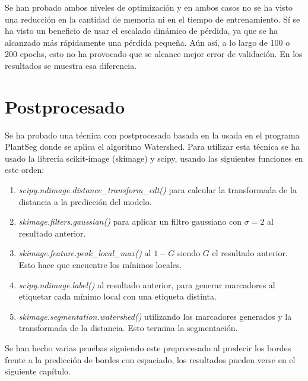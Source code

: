 Se han probado ambos niveles de optimización y en ambos casos no se ha visto una reducción en la cantidad de memoria ni en el tiempo de entrenamiento. Sí se ha visto un beneficio de usar el escalado dinámico de pérdida, ya que se ha alcanzado más rápidamente una pérdida pequeña. Aún así, a lo largo de 100 o 200 epochs, esto no ha provocado que se alcance mejor error de validación. En los resultados se muestra esa diferencia.

\section{Postprocesado}\label{sec:data_loading_processing}

Se ha probado una técnica con postprocesado basada en la usada en el programa PlantSeg \cite{Wolny2020} donde se aplica el algoritmo Watershed. Para utilizar esta técnica se ha usado la librería scikit-image (skimage) y scipy, usando las siguientes funciones en este orden:
\begin{enumerate}
\item \textit{scipy.ndimage.distance\_transform\_edt()} para calcular la transformada de la distancia a la predicción del modelo.
\item \textit{skimage.filters.gaussian()} para aplicar un filtro gaussiano con $\sigma = 2$ al resultado anterior.
\item \textit{skimage.feature.peak\_local\_max()} al $1 - G$ siendo $G$ el resultado anterior. Esto hace que encuentre los mínimos locales.
\item \textit{scipy.ndimage.label()} al resultado anterior, para generar marcadores al etiquetar cada mínimo local con una etiqueta distinta.
\item \textit{skimage.segmentation.watershed()} utilizando los marcadores generados y la transformada de la distancia. Esto termina la segmentación.
\end{enumerate}

Se han hecho varias pruebas siguiendo este preprocesado al predecir los bordes frente a la predicción de bordes con espaciado, los resultados pueden verse en el siguiente capítulo.